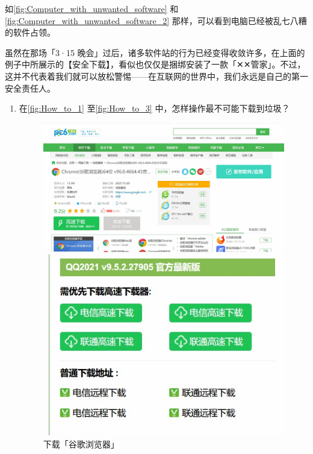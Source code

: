 {{如\autoref{fig:Computer_with_unwanted_software} 和\autoref{fig:Computer_with_unwanted_software_2} 那样，可以看到电脑已经被乱七八糟的软件占领。

虽然在那场「3·15 晚会」过后，诸多软件站的行为已经变得收敛许多，在上面的例子中所展示的【安全下载】，看似也仅仅是捆绑安装了一款「✕✕管家」。不过，这并不代表着我们就可以放松警惕——在互联网的世界中，我们永远是自己的第一安全责任人。

\practice

\begin{enumerate}
  \item 在\autoref{fig:How_to_1} 至\autoref{fig:How_to_3} 中，怎样操作最不可能下载到垃圾？
  \begin{figure}[htb!]
    \centering
    \begin{minipage}{.6\textwidth}
      \centering
      \includegraphics[width=.9\textwidth]{assets/basic/How_to_1.jpg}
      \caption{下载「谷歌浏览器」}
      \label{fig:How_to_1}
    \end{minipage}
    \begin{minipage}{.39\textwidth}
      \centering
      \includegraphics[width=.8\textwidth]{assets/basic/How_to_2.jpg}

\end{minipage}
\end{figure}
\end{enumerate}}}
